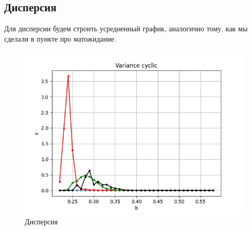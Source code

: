 \subsection{Дисперсия}

    Для дисперсии будем строить усредненный график, аналогично тому, как мы сделали в пункте про матожидание.

        
    \begin{figure}
        \centering
        \includegraphics[width=\textwidth]{stochastic/images/variance_cyclic.jpg}
        
        \captionsetup{justification=centering}
        \caption{Дисперсия}
        \label{variance_cyclic}
    \end{figure}